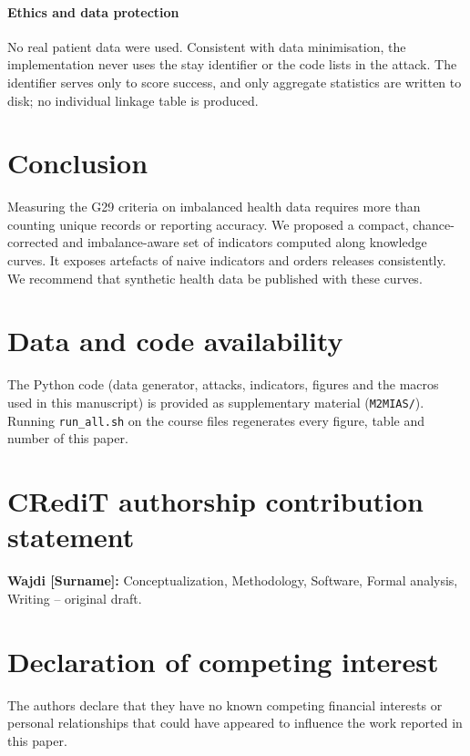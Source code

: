 \documentclass[preprint,12pt]{elsarticle}
\newcommand{\G}{G29}
\begin{document}
\paragraph{Ethics and data protection}
No real patient data were used. Consistent with data minimisation, the implementation never uses the stay identifier or the code lists in the attack. The identifier serves only to score success, and only aggregate statistics are written to disk; no individual linkage table is produced.

\section{Conclusion}
Measuring the \G{} criteria on imbalanced health data requires more than counting unique records or reporting accuracy. We proposed a compact, chance-corrected and imbalance-aware set of indicators computed along knowledge curves. It exposes artefacts of naive indicators and orders releases consistently. We recommend that synthetic health data be published with these curves.

\section*{Data and code availability}
\label{sec:availability}
The Python code (data generator, attacks, indicators, figures and the macros used in this manuscript) is provided as supplementary material (\texttt{M2MIAS/}). Running \texttt{run\_all.sh} on the course files regenerates every figure, table and number of this paper.

\section*{CRediT authorship contribution statement}
\textbf{Wajdi [Surname]:} Conceptualization, Methodology, Software, Formal analysis, Writing -- original draft. %

\section*{Declaration of competing interest}
The authors declare that they have no known competing financial interests or personal relationships that could have appeared to influence the work reported in this paper.
\end{document}
